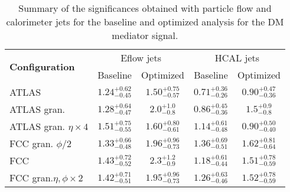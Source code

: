 \begin{table}[h]
	\caption{Summary of the significances obtained with particle flow and calorimeter jets for the baseline and optimized analysis for the DM mediator signal.}
	\label{table:sum_DM}
	\centering
	\begin{tabular}{lcccc}
		\hline
		\multirow{2}{*}{\textbf{Configuration}} & \multicolumn{2}{c}{Eflow jets}    & \multicolumn{2}{c}{HCAL jets} \\ \cline{2-5} 
		& Baseline & Optimized & Baseline  & Optimized           \\ \midrule \midrule
		ATLAS& $1.24^{+0.62}_{-0.45}$& $1.50^{+0.75}_{-0.57}$  & $0.71^{+0.36}_{-0.26}$  & $0.90^{+0.47}_{-0.36}$           \\ 
		\rowcolor{black!7}ATLAS gran.& $1.28^{+0.64}_{-0.47}$ & $2.0^{+1.0}_{-0.8}$ & $0.86^{+0.45}_{-0.36}$ & $1.5^{+0.9}_{-0.8}$          \\ 
		ATLAS gran. $\eta\times 4$& $1.51^{+0.75}_{-0.55}$ & $1.60^{+0.80}_{-0.61}$ & $1.14^{+0.61}_{-0.48}$& $0.90^{+0.50}_{-0.40}$    \\ 
		\rowcolor{black!7}FCC gran. $\phi/2$& $1.33^{+0.66}_{-0.48}$ & $1.96^{+0.96}_{-0.73}$ & $1.36^{+0.69}_{-0.51}$ & $1.62^{+0.81}_{-0.64}$           \\ 
		FCC& $1.43^{+0.72}_{-0.52}$ & $2.3^{+1.2}_{-0.9}$ & $1.18^{+0.61}_{-0.44}$ & $1.51^{+0.78}_{-0.59}$           \\ 
		\rowcolor{black!7}FCC gran.$\eta,\phi \times 2$& $1.42^{+0.71}_{-0.51}$ & $1.95^{+0.96}_{-0.73}$ & $1.26^{+0.63}_{-0.46}$ & $1.52^{+0.78}_{-0.59}$ \\ \bottomrule
	\end{tabular}
	
\end{table}

